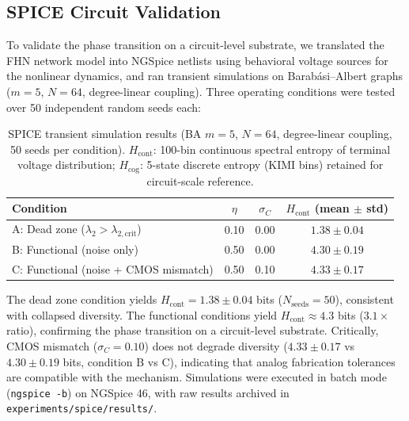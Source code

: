 \documentclass[11pt]{article}
\begin{document}
\subsection{SPICE Circuit Validation}
\label{sec:spice_validation}

To validate the phase transition on a circuit-level substrate, we translated the FHN network model into NGSpice netlists using behavioral voltage sources for the nonlinear dynamics, and ran transient simulations on Barab\'{a}si--Albert graphs ($m = 5$, $N = 64$, degree-linear coupling). Three operating conditions were tested over 50 independent random seeds each:

\begin{table}[ht]
\centering
\caption{SPICE transient simulation results (BA $m=5$, $N=64$, degree-linear coupling, 50 seeds per condition). $H_{\text{cont}}$: 100-bin continuous spectral entropy of terminal voltage distribution; $H_{\text{cog}}$: 5-state discrete entropy (KIMI bins) retained for circuit-scale reference.}
\label{tab:spice_validation}
\begin{tabular}{lccc}
\toprule
\textbf{Condition} & $\eta$ & $\sigma_C$ & $H_{\text{cont}}$ (mean $\pm$ std) \\
\midrule
A: Dead zone ($\lambda_2 > \lambda_{2,\mathrm{crit}}$) & 0.10 & 0.00 & $1.38 \pm 0.04$ \\
B: Functional (noise only)                              & 0.50 & 0.00 & $4.30 \pm 0.19$ \\
C: Functional (noise + CMOS mismatch)                  & 0.50 & 0.10 & $4.33 \pm 0.17$ \\
\bottomrule
\end{tabular}
\end{table}

The dead zone condition yields $H_{\text{cont}} = 1.38 \pm 0.04$ bits ($N_{\text{seeds}}=50$), consistent with collapsed diversity. The functional conditions yield $H_{\text{cont}} \approx 4.3$ bits ($3.1\times$ ratio), confirming the phase transition on a circuit-level substrate. Critically, CMOS mismatch ($\sigma_C = 0.10$) does not degrade diversity ($4.33 \pm 0.17$ vs $4.30 \pm 0.19$ bits, condition B vs C), indicating that analog fabrication tolerances are compatible with the mechanism. Simulations were executed in batch mode (\texttt{ngspice -b}) on NGSpice 46, with raw results archived in \texttt{experiments/spice/results/}.

\end{document}
